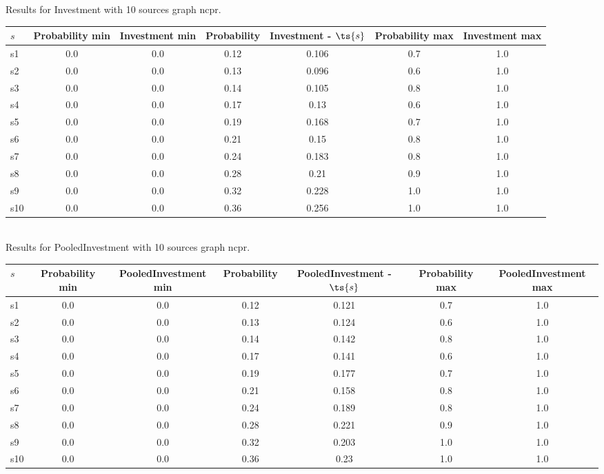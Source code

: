\documentclass{article}
\begin{document}
\noindent Results for Investment with 10 sources graph ncpr.

\noindent\begin{tabular}{|l|c|c|c|c|c|c|}
\hline
$s$& Probability min & Investment min & Probability & Investment - $\ts{s}$ & Probability max & Investment max\\
\hline
s1 &0.0 & 0.0 & 0.12 & 0.106 & 0.7 & 1.0\\
\hline
s2 &0.0 & 0.0 & 0.13 & 0.096 & 0.6 & 1.0\\
\hline
s3 &0.0 & 0.0 & 0.14 & 0.105 & 0.8 & 1.0\\
\hline
s4 &0.0 & 0.0 & 0.17 & 0.13 & 0.6 & 1.0\\
\hline
s5 &0.0 & 0.0 & 0.19 & 0.168 & 0.7 & 1.0\\
\hline
s6 &0.0 & 0.0 & 0.21 & 0.15 & 0.8 & 1.0\\
\hline
s7 &0.0 & 0.0 & 0.24 & 0.183 & 0.8 & 1.0\\
\hline
s8 &0.0 & 0.0 & 0.28 & 0.21 & 0.9 & 1.0\\
\hline
s9 &0.0 & 0.0 & 0.32 & 0.228 & 1.0 & 1.0\\
\hline
s10 &0.0 & 0.0 & 0.36 & 0.256 & 1.0 & 1.0\\
\hline
\end{tabular}\\

\noindent Results for PooledInvestment with 10 sources graph ncpr.

\noindent\begin{tabular}{|l|c|c|c|c|c|c|}
\hline
$s$& Probability min & PooledInvestment min & Probability & PooledInvestment - $\ts{s}$ & Probability max & PooledInvestment max\\
\hline
s1 &0.0 & 0.0 & 0.12 & 0.121 & 0.7 & 1.0\\
\hline
s2 &0.0 & 0.0 & 0.13 & 0.124 & 0.6 & 1.0\\
\hline
s3 &0.0 & 0.0 & 0.14 & 0.142 & 0.8 & 1.0\\
\hline
s4 &0.0 & 0.0 & 0.17 & 0.141 & 0.6 & 1.0\\
\hline
s5 &0.0 & 0.0 & 0.19 & 0.177 & 0.7 & 1.0\\
\hline
s6 &0.0 & 0.0 & 0.21 & 0.158 & 0.8 & 1.0\\
\hline
s7 &0.0 & 0.0 & 0.24 & 0.189 & 0.8 & 1.0\\
\hline
s8 &0.0 & 0.0 & 0.28 & 0.221 & 0.9 & 1.0\\
\hline
s9 &0.0 & 0.0 & 0.32 & 0.203 & 1.0 & 1.0\\
\hline
s10 &0.0 & 0.0 & 0.36 & 0.23 & 1.0 & 1.0\\
\hline
\end{tabular}\\
\end{document}

